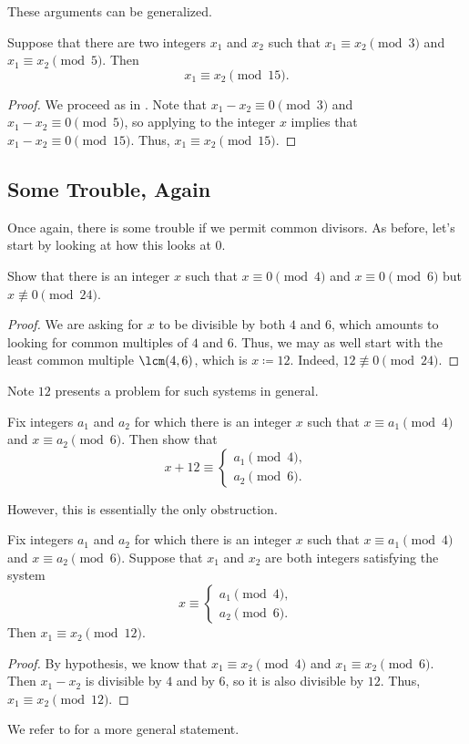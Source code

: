 \documentclass{article}
\begin{document}
These arguments can be generalized.
\begin{proposition} \label{prop:crt-uniq-mod-3-mod-5-general}
	Suppose that there are two integers $x_1$ and $x_2$ such that $x_1\equiv x_2\pmod3$ and $x_1\equiv x_2\pmod5$. Then
	\[x_1\equiv x_2\pmod{15}.\]
\end{proposition}
\begin{proof}
	We proceed as in . Note that $x_1-x_2\equiv0\pmod3$ and $x_1-x_2\equiv0\pmod5$, so applying  to the integer $x$ implies that $x_1-x_2\equiv0\pmod{15}$. Thus, $x_1\equiv x_2\pmod{15}$.
\end{proof}

\subsection{Some Trouble, Again}
Once again, there is some trouble if we permit common divisors. As before, let's start by looking at how this looks at $0$.
\begin{example}
	Show that there is an integer $x$ such that $x\equiv0\pmod4$ and $x\equiv0\pmod6$ but $x\not\equiv0\pmod{24}$.
\end{example}
\begin{proof}
	We are asking for $x$ to be divisible by both $4$ and $6$, which amounts to looking for common multiples of $4$ and $6$. Thus, we may as well start with the least common multiple $\lcm(4,6)$, which is $x\coloneqq12$. Indeed, $12\not\equiv0\pmod{24}$.
\end{proof}
Note $12$ presents a problem for such systems in general.
\begin{exe}
	Fix integers $a_1$ and $a_2$ for which there is an integer $x$ such that $x\equiv a_1\pmod4$ and $x\equiv a_2\pmod6$. Then show that
	\[x+12\equiv\begin{cases}
		a_1\pmod4, \\
		a_2\pmod6.
	\end{cases}\]
\end{exe}
However, this is essentially the only obstruction.
\begin{proposition}
	Fix integers $a_1$ and $a_2$ for which there is an integer $x$ such that $x\equiv a_1\pmod4$ and $x\equiv a_2\pmod6$. Suppose that $x_1$ and $x_2$ are both integers satisfying the system
	\[x\equiv\begin{cases}
		a_1\pmod4, \\
		a_2\pmod6.
	\end{cases}\]
	Then $x_1\equiv x_2\pmod{12}$.
\end{proposition}
\begin{proof}
	By hypothesis, we know that $x_1\equiv x_2\pmod4$ and $x_1\equiv x_2\pmod6$. Then $x_1-x_2$ is divisible by $4$ and by $6$, so it is also divisible by $12$. Thus, $x_1\equiv x_2\pmod{12}$.
\end{proof}
We refer to  for a more general statement.
\end{document}

